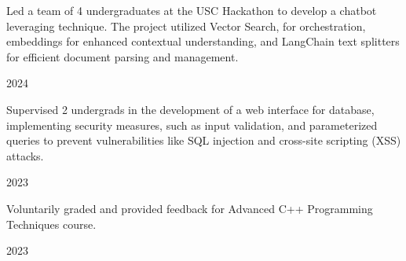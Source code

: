 
\vspace{-0.7cm}
\begin{cvleadership}
    \hspace{0cm}
    \cvled
        {
            \begin{cvitems}
                \item {Led a team of 4 undergraduates at the USC Hackathon to develop a chatbot leveraging  technique. The project utilized  Vector Search,  for orchestration,  embeddings for enhanced contextual understanding, and LangChain text splitters for efficient document parsing and management.}
            \end{cvitems}
        }
        {}
        {2024} %
    \cvled
        {
            \begin{cvitems}
                \item {Supervised 2 undergrads in the development of a  web interface for database, implementing security measures, such as input validation, and parameterized queries to prevent vulnerabilities like SQL injection and cross-site scripting (XSS) attacks.}
            \end{cvitems}
        }
        {}
        {2023} %
    \cvled
        {
            \begin{cvitems}
                \item {Voluntarily graded and provided feedback for Advanced C++ Programming Techniques course.}
            \end{cvitems}
        }
        {}
        {2023} %
    \cvled
        {
            \begin{cvitems}

\end{cvitems}}
\end{cvleadership}
